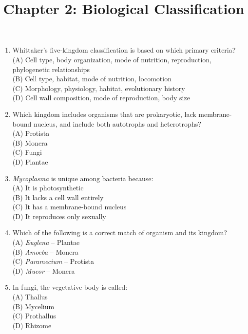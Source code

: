 \documentclass{article}
\begin{document}
\title{Chapter 2: Biological Classification}
\date{}
\maketitle

\begin{enumerate}[label=Q\arabic*.]

\item Whittaker's five-kingdom classification is based on which primary criteria?
\\(A) Cell type, body organization, mode of nutrition, reproduction, phylogenetic relationships
\\(B) Cell type, habitat, mode of nutrition, locomotion
\\(C) Morphology, physiology, habitat, evolutionary history
\\(D) Cell wall composition, mode of reproduction, body size

\item Which kingdom includes organisms that are prokaryotic, lack membrane-bound nucleus, and include both autotrophs and heterotrophs?
\\(A) Protista
\\(B) Monera
\\(C) Fungi
\\(D) Plantae

\item \textit{Mycoplasma} is unique among bacteria because:
\\(A) It is photosynthetic
\\(B) It lacks a cell wall entirely
\\(C) It has a membrane-bound nucleus
\\(D) It reproduces only sexually

\item Which of the following is a correct match of organism and its kingdom?
\\(A) \textit{Euglena} -- Plantae
\\(B) \textit{Amoeba} -- Monera
\\(C) \textit{Paramecium} -- Protista
\\(D) \textit{Mucor} -- Monera

\item In fungi, the vegetative body is called:
\\(A) Thallus
\\(B) Mycelium
\\(C) Prothallus
\\(D) Rhizome


\end{enumerate}
\end{document}
